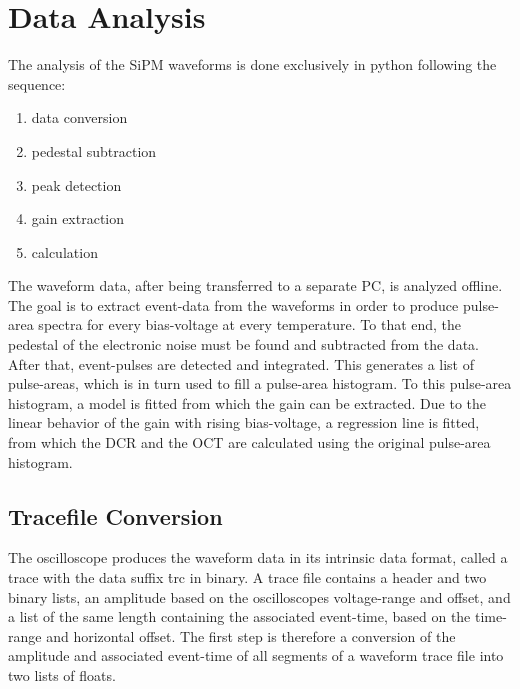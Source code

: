 \documentclass[12pt,article,type=msc,colorback,accentcolor=tud9c]{tudthesis}
\begin{document}
\section{\Large Data Analysis}
The analysis of the SiPM waveforms is done exclusively in python following the sequence:\\
\begin{enumerate}[topsep=0pt,itemsep=-1ex,partopsep=1ex,parsep=1ex]
\item data conversion
\item pedestal subtraction
\item peak detection
\item gain extraction
\item calculation
\end{enumerate}
The waveform data, after being transferred to a separate PC, is analyzed offline. The goal is to extract event-data from the waveforms in order to produce pulse-area spectra for every bias-voltage at every temperature. To that end, the pedestal of the electronic noise must be found and subtracted from the data. After that, event-pulses are detected and integrated. This generates a list of pulse-areas, which is in turn used to fill a pulse-area histogram. To this pulse-area histogram, a model is fitted from which the gain can be extracted. Due to the linear behavior of the gain with rising bias-voltage, a regression line is fitted, from which the DCR and the OCT are calculated using the original pulse-area histogram.
\subsection{Tracefile Conversion}
The oscilloscope produces the waveform data in its intrinsic data format, called a trace with the data suffix \.trc in binary. A trace file contains a header and two binary lists, an amplitude based on the oscilloscopes voltage-range and offset, and a list of the same length containing the associated event-time, based on the time-range and horizontal offset. The first step is therefore a conversion of the amplitude and associated event-time of all segments of a waveform trace file into two lists of floats. 
\clearpage
\end{document}

